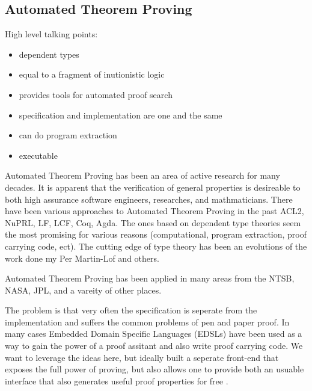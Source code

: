 \documentclass[12pt, titlepage]{article}
\begin{document}
\subsection{Automated Theorem Proving}
High level talking points: \\
\begin{itemize}
    \item dependent types
    \item equal to a fragment of inutionistic logic
    \item provides tools for automated proof search
    \item specification and implementation are one and the same
    \item can do program extraction
    \item executable 
\end{itemize}

Automated Theorem Proving has been an area of active research for many decades. It is apparent that the
verification of general properties is desireable to both high assurance software engineers, researches, and
mathmaticians. There have been various approaches to Automated Theorem Proving in the past ACL2, NuPRL, LF,
LCF, Coq, Agda. The ones based on dependent type theories seem the most promising for various reasons 
(computational, program extraction, proof carrying code, ect). The cutting edge of type theory has been
an evolutions of the work done my Per Martin-Lof and others.

Automated Theorem Proving has been applied in many areas from the NTSB, NASA, JPL, and a vareity of other places.

The problem is that very often the specification is seperate from the implementation and suffers the common
problems of pen and paper proof. In many cases Embedded Domain Specific Languages (EDSLs)
have been used as a way to gain the power of a proof assitant and also write proof carrying code. We want
to leverage the ideas here, but ideally built a seperate front-end that exposes the full power of proving,
but also allows one to provide both an usuable interface that also generates useful proof properties for
free \cite{Ricketts:2014}. \cite{chlipala2011certified} \cite{Pierce:SF}
\\
\end{document}
